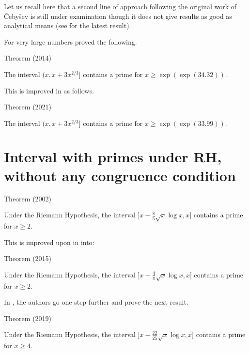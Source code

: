  

\par 

Let us recall here that a second line of approach following the original
work of \v Ceby\v sev is still under examination though it does not give
results as good
as analytical means (see
\cite{CostaPereira*89}
for the latest result).

\par 

For very large numbers
\cite{Dudek*16b}
proved the following.
\begin{thm}{Theorem (2014)}

The interval $(x,x+3 x^{2/3}]$ contains a prime for $x\ge \exp(\exp(34.32))$.
\end{thm}



This is improved in 
\cite{Cully*21} as follows.

\begin{thm}{Theorem (2021)}

The interval $(x,x+3 x^{2/3}]$ contains a prime for $x\ge \exp(\exp(33.99))$.
\end{thm}



\section{Interval with primes under RH, without any congruence condition}



\begin{thm}{Theorem (2002)}

Under the Riemann Hypothesis, the interval $\bigl]x-\tfrac85\sqrt{x}\log x,x\bigr]$
contains a prime for $x\ge2$.
\end{thm}

This is improved upon
in 
\cite{Dudek*15} 
into:
\begin{thm}{Theorem (2015)}

Under the Riemann Hypothesis, the interval $\bigl]x-\tfrac4{\pi}\sqrt{x}\log x,x\bigr]$
contains a prime for $x\ge2$.
\end{thm}


In \cite{Carneiro-Milinovich-Soundararajan*19}, the authors go one step further and prove the next result.
\begin{thm}{Theorem (2019)}

Under the Riemann Hypothesis, the interval $\bigl]x-\tfrac{22}{25}\sqrt{x}\log x,x\bigr]$
contains a prime for $x\ge4$.
\end{thm}



